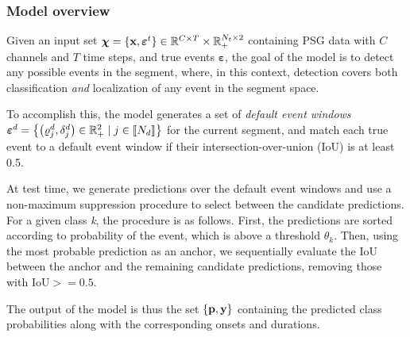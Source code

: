 \subsubsection{Model overview}

Given an input set \( \boldsymbol{\chi} = \braces*{\mathbf{x}, \boldsymbol{\varepsilon}^t} \in \R{C \times T} \times \R{N_t \times 2}_+ \) containing \ac{PSG} data with \(C\) channels and \(T\) time steps, and true events \(\boldsymbol{\varepsilon}\), the goal of the model is to detect any possible events in the segment, where, in this context, detection covers both classification \textit{and} localization of any event in the segment space.

To accomplish this, the model generates a set of \textit{default event windows} \(\boldsymbol{\varepsilon}^d = \braces*{ \parentheses*{ \varrho^{d}_j, \delta^d_j } \in \R{2}_+ \mid j \in \bbrackets*{N_d} }\) for the current segment, and match each true event to a default event window if their intersection-over-union (IoU) is at least 0.5.

At test time, we generate predictions over the default event windows and use a non-maximum suppression procedure to select between the candidate predictions.
For a given class \textit{k}, the procedure is as follows.
First, the predictions are sorted according to probability of the event, which is above a threshold \(\theta_k\).
Then, using the most probable prediction as an anchor, we sequentially evaluate the IoU between the anchor and the remaining candidate predictions, removing those with \(\text{IoU}>=0.5\).

The output of the model is thus the set \(\braces*{\mathbf{p}, \mathbf{y}}\) containing the predicted class probabilities along with the corresponding onsets and durations.



